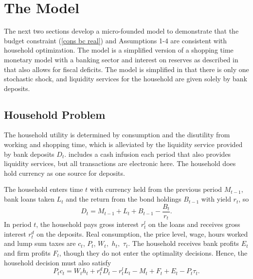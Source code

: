 \documentclass[]{article}
\begin{document}
\section{The Model}

The next two sections develop a micro-founded model to demonstrate that the budget constraint (\ref{cons bc real}) and Assumptions 1-4 are consistent with household optimization. The model is a simplified version of a shopping time monetary model with a banking sector and interest on reserves as described in \textcite{ireland2014macroeconomics} that also allows for fiscal deficits. The model is simplified in that there is only one stochastic shock, and liquidity services for the household are given solely by bank deposits.

\subsection{Household Problem}

The household utility is determined by consumption and the disutility from
working and shopping time, which is alleviated by the liquidity service provided by
bank deposits $D_{t}$. \textcite{ireland2014macroeconomics} includes a cash infusion each period that also provides liquidity services, but all transactions are electronic here. The household does hold currency as one source for deposits.

The household enters time $t$ with currency held from
the previous period $M_{t-1}$, bank loans taken $L_{t}$ and the return from the bond holdings $B_{t-1}$ with yield $r_{t}$, so%
\begin{equation}
D_{t}=M_{t-1}+L_{t}+B_{t-1}-\frac{B_{t}}{r_{t}}.  \label{HHBC1}
\end{equation}%
In period $t$, the household pays gross interest $r_{t}^{l}$ on the loans and
receives gross interest $r_{t}^{d}$ on the deposits. Real consumption, the
price level, wage, hours worked and lump sum taxes are $c_{t}$, $P_{t}$, $%
W_{t},$ $h_{t},$ $\tau _{t}$. The household receives bank profits $E_{t}$ and firm profits $F_{t}$, though they do not enter the optimality decisions.
Hence, the household decision must also satisfy%
\begin{equation}
P_{t}c_{t}=W_{t}h_{t}+r_{t}^{d}D_{t}-r_{t}^{l}L_{t}-M_{t}+F_{t}+E_{t}-P_{t}%
\tau _{t}.  \label{HHBC2}
\end{equation}
\end{document}
